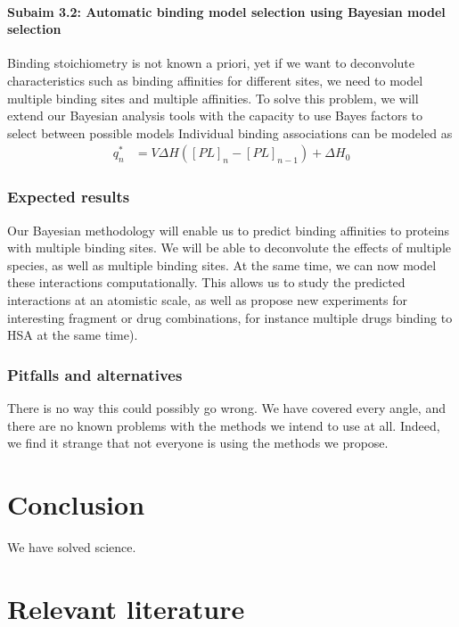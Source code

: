 \documentclass[10pt]{article}
\newcommand{\subsubsubsection}[1]{\paragraph*{#1}}
\begin{document}
\subsubsubsection{Subaim 3.2: Automatic binding model selection using Bayesian model selection}
Binding stoichiometry is not known a priori, yet if we want to deconvolute characteristics such as binding affinities for different sites, we need to model multiple binding sites and multiple affinities. To solve this problem, we will extend our Bayesian analysis tools with the capacity to use Bayes factors to select between possible models 
Individual binding associations can be modeled as
\begin{align}
q_n^* &= V \Delta H \left( [PL]_n - [PL]_{n-1} \right) + \Delta H_0 \label{equation:liberated-heat}
\end{align}

\subsubsection*{Expected results}
Our Bayesian methodology will enable us to predict binding affinities to proteins with multiple binding sites. We will be able to deconvolute the effects of multiple species, as well as multiple binding sites. At the same time, we can now model these interactions computationally. This allows us to study the predicted interactions at an atomistic scale, as well as propose new experiments for interesting fragment or drug combinations, for instance multiple drugs binding to HSA at the same time).

\subsubsection*{Pitfalls and alternatives}
There is no way this could possibly go wrong. We have covered every angle, and there are no known problems with the methods we intend to use at all. Indeed, we find it strange that not everyone is using the methods we propose.
\section*{Conclusion}
We have solved science.

\printbibliography
\nocite{*}
\section*{Relevant literature}
\printbibliography[heading=none]
\end{document}
